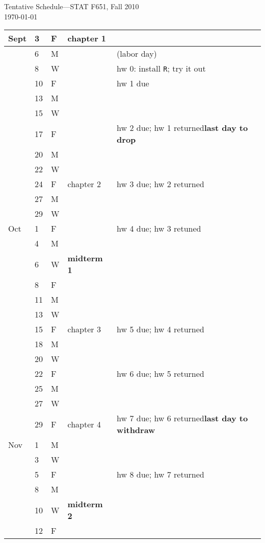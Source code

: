\documentclass{article}
\begin{document}
\thispagestyle{empty}
\begin{center}
{\Large Tentative Schedule---STAT F651, Fall 2010}\\[2mm]
\today
\bigskip

\renewcommand\arraystretch{1.15}
\begin{tabular*}{0.99\textwidth}{%
    p{}p{}p{}
    |p{}
    |p{}}
Sept
& 3 & F & chapter 1 & \\ \hline
& 6 & M &  & (labor day)\\
& 8 & W & & hw 0: install \texttt{R}; try it out\\
& 10 & F & & hw 1 due\\ \hline
& 13 & M & & \\
& 15 & W & & \\
& 17 & F & & hw 2 due; hw 1 returned\hfil \textbf{last day to drop}\\ \hline
& 20 & M & & \\
& 22 & W & & \\
& 24 & F & chapter 2& hw 3 due; hw 2 returned\\ \hline
& 27 & M & & \\
& 29 & W & & \\
Oct
& 1 & F & & hw 4 due; hw 3 retuned\\ \hline
& 4 & M & & \\
& 6 & W & \textbf{midterm 1} & \\
& 8 & F & & \\ \hline
& 11 & M & & \\
& 13 & W & & \\
& 15 & F & chapter 3 & hw 5 due; hw 4 returned\\ \hline
& 18 & M & & \\
& 20 & W & & \\
& 22 & F & & hw 6 due; hw 5 returned\\ \hline
& 25 & M & & \\
& 27 & W & & \\
& 29 & F & chapter 4 & hw 7 due; hw 6 returned\hfil\textbf{last day to withdraw}\\ \hline
Nov
& 1 & M & & \\
& 3 & W & & \\
& 5 & F & & hw 8 due; hw 7 returned\\ \hline
& 8 & M & & \\
& 10 & W & \textbf{midterm 2} & \\
& 12 & F & &  \\ \hline

\end{tabular*}
\end{center}
\end{document}
